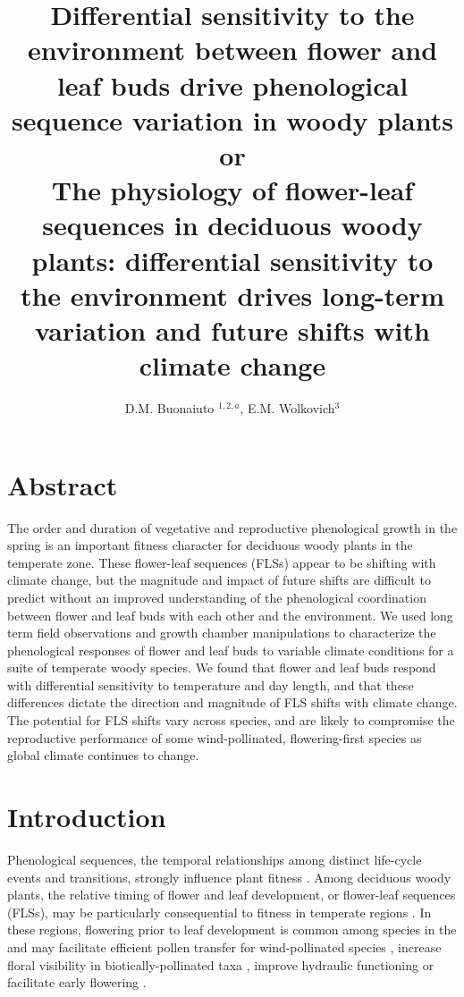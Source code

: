 \documentclass[11pt]{article}
\title{Differential sensitivity to the environment between flower and leaf buds drive phenological sequence variation in woody plants\\
or\\
The physiology of flower-leaf sequences in deciduous woody plants: differential sensitivity to the environment drives long-term variation and future shifts with climate change}
\date{}
\author{D.M. Buonaiuto $^{1,2,a}$, E.M. Wolkovich$^{3}$}
\begin{document}
\maketitle
\section*{Abstract}
The order and duration of vegetative and reproductive phenological growth in the spring is an important fitness character for deciduous woody plants in the temperate zone. These flower-leaf sequences (FLSs) appear to be shifting with climate change, but the magnitude and impact of future shifts are difficult to predict without an improved understanding of the phenological coordination between flower and leaf buds with each other and the environment. We used long term field observations and growth chamber manipulations to characterize the phenological responses of flower and leaf buds to variable climate conditions for a suite of temperate woody species. We found that flower and leaf buds respond with differential sensitivity to temperature and day length, and that these differences dictate the direction and magnitude of FLS shifts with climate change. The potential for FLS shifts vary across species, and are likely to compromise the reproductive performance of some wind-pollinated, flowering-first species as global climate continues to change.  %

\section*{Introduction}
\noindent  Phenological sequences, the temporal relationships among distinct life-cycle events and transitions, strongly influence plant fitness \citep{Ettinger2018,Savage2019,Chamberlin}. Among deciduous woody plants, the relative timing of flower and leaf development, or flower-leaf sequences (FLSs), may be particularly consequential to fitness in temperate regions \citep{Gougherty2018}. In these regions, flowering prior to leaf development is common among species in the and may facilitate efficient pollen transfer for wind-pollinated species \citep{Rathcke_1985}, increase floral visibility in biotically-pollinated taxa \citep{Janzen1967}, improve hydraulic functioning \citep{Gougherty2018,Reich1984} or facilitate early flowering \citep{Primack1987}.\\
\end{document}
